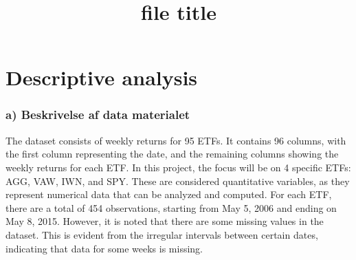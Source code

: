 \documentclass{rapport}
\title{file title} %
\begin{document}
\onehalfspacing


\subject{Subject} %


        
\buildmargins %
\buildcover %
\toc %

\section{Descriptive analysis}
\subsubsection*{\textbf{a)} Beskrivelse af data materialet}
\noindent
The dataset consists of weekly returns for 95 ETFs. It contains 96 columns, with the first column representing the date, and the remaining columns showing the weekly returns for each ETF.
In this project, the focus will be on 4 specific ETFs: AGG, VAW, IWN, and SPY. These are considered quantitative variables, as they represent numerical data that can be analyzed and computed.
For each ETF, there are a total of 454 observations, starting from May 5, 2006 and ending on May 8, 2015. However, it is noted that there are some missing values in the dataset. 
This is evident from the irregular intervals between certain dates, indicating that data for some weeks is missing.


\end{document}

